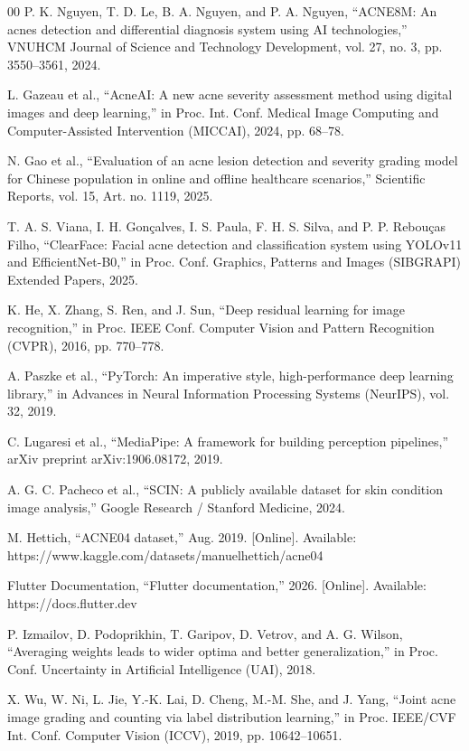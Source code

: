 \documentclass[conference]{IEEEtran}
\begin{document}
\begin{thebibliography}{00}
 P. K. Nguyen, T. D. Le, B. A. Nguyen, and P. A. Nguyen, “ACNE8M: An acnes detection and differential diagnosis system using AI technologies,” VNUHCM Journal of Science and Technology Development, vol. 27, no. 3, pp. 3550–3561, 2024.

 L. Gazeau et al., “AcneAI: A new acne severity assessment method using digital images and deep learning,” in Proc. Int. Conf. Medical Image Computing and Computer-Assisted Intervention (MICCAI), 2024, pp. 68–78.

 N. Gao et al., “Evaluation of an acne lesion detection and severity grading model for Chinese population in online and offline healthcare scenarios,” Scientific Reports, vol. 15, Art. no. 1119, 2025.

 T. A. S. Viana, I. H. Gonçalves, I. S. Paula, F. H. S. Silva, and P. P. Rebouças Filho, “ClearFace: Facial acne detection and classification system using YOLOv11 and EfficientNet-B0,” in Proc. Conf. Graphics, Patterns and Images (SIBGRAPI) Extended Papers, 2025.

 K. He, X. Zhang, S. Ren, and J. Sun, “Deep residual learning for image recognition,” in Proc. IEEE Conf. Computer Vision and Pattern Recognition (CVPR), 2016, pp. 770–778.

 A. Paszke et al., “PyTorch: An imperative style, high-performance deep learning library,” in Advances in Neural Information Processing Systems (NeurIPS), vol. 32, 2019.

 C. Lugaresi et al., “MediaPipe: A framework for building perception pipelines,” arXiv preprint arXiv:1906.08172, 2019.

 A. G. C. Pacheco et al., “SCIN: A publicly available dataset for skin condition image analysis,” Google Research / Stanford Medicine, 2024.

 M. Hettich, “ACNE04 dataset,” Aug. 2019. [Online]. Available: https://www.kaggle.com/datasets/manuelhettich/acne04

 Flutter Documentation, “Flutter documentation,” 2026. [Online]. Available: https://docs.flutter.dev

 P. Izmailov, D. Podoprikhin, T. Garipov, D. Vetrov, and A. G. Wilson, “Averaging weights leads to wider optima and better generalization,” in Proc. Conf. Uncertainty in Artificial Intelligence (UAI), 2018.

 X. Wu, W. Ni, L. Jie, Y.-K. Lai, D. Cheng, M.-M. She, and J. Yang, “Joint acne image grading and counting via label distribution learning,” in Proc. IEEE/CVF Int. Conf. Computer Vision (ICCV), 2019, pp. 10642–10651.


\end{thebibliography}
\end{document}
